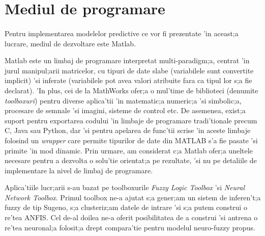 \section {Mediul de programare}

\paragraph{}

\par
Pentru implementarea modelelor predictive ce vor fi prezentate 'in aceast;a lucrare, mediul de dezvoltare este Matlab.
\par
Matlab este un limbaj de programare interpretat multi-paradigm;a, centrat 'in jurul manipul;arii matricelor, cu tipuri de date slabe (variabilele sunt convertite implicit) 'si inferate (variabilele pot avea valori atribuite fara ca tipul lor s;a fie declarat).  'In plus, cei de la MathWorks ofer;a o mul'time de biblioteci (denumite \textit{toolboxuri}) pentru diverse aplica'tii 'in matematic;a numeric;a 'si simbolic;a, procesare de semnale 'si imagini, sisteme de control etc. De asemenea, exist;a suport pentru exportarea codului 'in limbaje de programare tradi'tionale precum C, Java sau Python, dar 'si pentru apelarea de func'tii scrise 'in aceste limbaje folosind un \textit{wrapper} care permite tipurilor de date din MATLAB s'a fie pasate 'si primite 'in mod dinamic.  Prin urmare, am considerat c;a Matlab ofer;a uneltele necesare pentru a dezvolta o solu'tie orientat;a pe rezultate, 'si nu pe detaliile de implementare la nivel de limbaj de programare. 
\par
Aplica'tiile lucr;arii s-au bazat pe toolboxurile \textit{Fuzzy Logic Toolbox} 'si \textit{Neural Network Toolbox}. Primul toolbox ne-a ajutat s;a gener;am un sistem de inferen't;a fuzzy de tip Sugeno, s;a clusteriz;am datele de intrare 'si s;a putem construi o re'tea ANFIS. Cel de-al doilea ne-a oferit posibilitatea de a construi 'si antrena o re'tea neuronal;a folosit;a drept compara'tie pentru modelul neuro-fuzzy propus. 